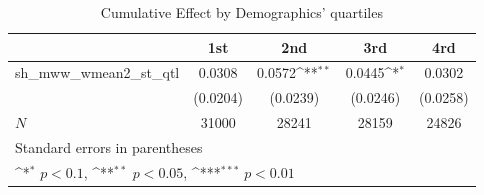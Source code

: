 \begin{table}[htbp]\centering
\def\sym#1{\ifmmode^{#1}\else\(^{#1}\)\fi}
\caption{Cumulative Effect by Demographics' quartiles}
\begin{tabular}{l*{4}{c}}
\hline\hline
            &\multicolumn{1}{c}{1st}&\multicolumn{1}{c}{2nd}&\multicolumn{1}{c}{3rd}&\multicolumn{1}{c}{4rd}\\
\hline
sh\_mww\_wmean2\_st\_qtl&      0.0308         &      0.0572\sym{**} &      0.0445\sym{*}  &      0.0302         \\
            &    (0.0204)         &    (0.0239)         &    (0.0246)         &    (0.0258)         \\
\hline
\(N\)       &       31000         &       28241         &       28159         &       24826         \\
\hline\hline
\multicolumn{5}{l}{\footnotesize Standard errors in parentheses}\\
\multicolumn{5}{l}{\footnotesize \sym{*} \(p<0.1\), \sym{**} \(p<0.05\), \sym{***} \(p<0.01\)}\\
\end{tabular}
\end{table}
